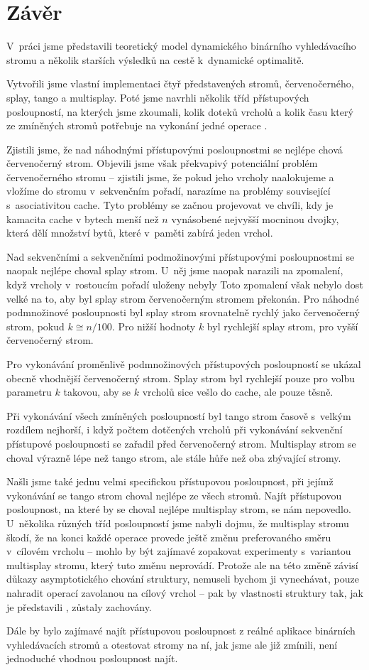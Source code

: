 \chapter*{Závěr}

V~práci jsme představili teoretický model dynamického binárního vyhledávacího stromu a několik starších výsledků na cestě k~dynamické optimalitě.

Vytvořili jsme vlastní implementaci čtyř představených stromů, červenočerného, splay, tango a multisplay. Poté jsme navrhli několik tříd přístupových posloupností, na kterých jsme zkoumali, kolik doteků vrcholů a kolik času který ze zmíněných stromů potřebuje na vykonání jedné operace . 

Zjistili jsme, že nad náhodnými přístupovými posloupnostmi se nejlépe chová
červenočerný strom. Objevili jsme však překvapivý potenciální problém
červenočerného stromu -- zjistili jsme, že pokud jeho vrcholy naalokujeme a
vložíme do stromu v~sekvenčním pořadí, narazíme na problémy související
s~asociativitou cache. Tyto problémy se začnou projevovat ve chvíli, kdy je kamacita cache v bytech menší než $n$
vynásobené nejvyšší mocninou dvojky, která dělí množství bytů, které v~paměti
zabírá jeden vrchol.

Nad sekvenčními a sekvenčními podmožinovými přístupovými posloupnostmi se naopak nejlépe choval splay strom. U~něj jsme naopak narazili na zpomalení, když vrcholy v~rostoucím pořadí uloženy nebyly Toto zpomalení však nebylo dost velké na to, aby byl splay strom červenočerným stromem překonán. Pro náhodné podmnožinové posloupnosti byl splay strom srovnatelně rychlý jako červenočerný strom, pokud $k \cong n/100$. Pro nižší hodnoty $k$ byl rychlejší splay strom, pro vyšší červenočerný strom. 

Pro vykonávání proměnlivě podmnožinových přístupových posloupností se ukázal obecně vhodnější červenočerný strom. Splay strom byl rychlejší pouze pro volbu parametru $k$ takovou, aby se $k$ vrcholů sice vešlo do cache, ale pouze těsně.

Při vykonávání všech zmíněných posloupností byl tango strom časově s~velkým
rozdílem nejhorší, i když počtem dotčených vrcholů při vykonávání sekvenční
přístupové posloupnosti se zařadil před červenočerný strom. Multisplay strom se
choval výrazně lépe než tango strom, ale stále hůře než oba zbývající stromy.

Našli jsme také jednu velmi specifickou přístupovou posloupnost, při jejímž vykonávání se tango strom choval nejlépe ze všech stromů. Najít přístupovou posloupnost, na které by se choval nejlépe multisplay strom, se nám nepovedlo. U~několika různých tříd posloupností jsme nabyli dojmu, že multisplay stromu škodí, že na konci každé operace  provede ještě změnu preferovaného směru v~cílovém vrcholu -- mohlo by být zajímavé zopakovat experimenty s~variantou multisplay stromu, který tuto změnu neprovádí. Protože ale na této změně závisí důkazy asymptotického chování struktury, nemuseli bychom ji vynechávat, pouze nahradit operací  zavolanou na cílový vrchol -- pak by vlastnosti struktury tak, jak je  představili \citet{multisplay}, zůstaly zachovány.

Dále by bylo zajímavé najít přístupovou posloupnost z reálné aplikace binárních vyhledávacích stromů a otestovat stromy na ní, jak jsme ale již zmínili, není jednoduché vhodnou posloupnost najít.

